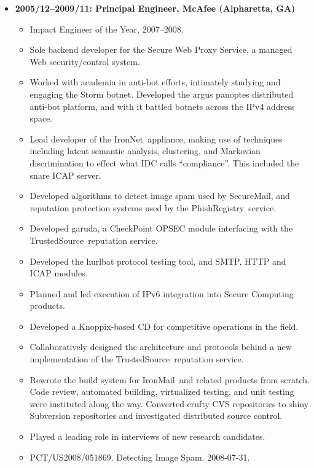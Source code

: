 \documentclass{article}
\newenvironment{tightitemize}
{\begin{itemize}
  \setlength{\itemsep}{1pt}
  \setlength{\parskip}{0pt}
  \setlength{\parsep}{0pt}}
{\end{itemize}}
\begin{document}
\begin{tightitemize}
\item \textbf{2005/12--2009/11: Principal Engineer, McAfee (Alpharetta, GA)}
\begin{tightitemize}
\item Impact Engineer of the Year, 2007--2008.
\item Sole backend developer for the Secure Web Proxy Service, a managed Web
  security/control system.
\item Worked with academia in anti-bot efforts, intimately studying and engaging
  the Storm botnet. Developed the argus panoptes distributed anti-bot
  platform, and with it battled botnets across the IPv4 address space.
\item Lead developer of the IronNet\texttrademark\ appliance, making use of techniques
  including latent semantic analysis, clustering, and Markovian discrimination
  to effect what IDC calls ``compliance''. This included the snare ICAP server.
\item Developed algorithms to detect image spam used by SecureMail\texttrademark, and
  reputation protection systems used by the PhishRegistry\texttrademark\ service.
\item Developed garuda, a CheckPoint\textsuperscript{\textregistered} OPSEC module interfacing with the
  TrustedSource\texttrademark\ reputation service.
\item Developed the hurlbat protocol testing tool, and SMTP, HTTP and ICAP modules.
\item Planned and led execution of IPv6 integration into Secure Computing products.
\item Developed a Knoppix\textsuperscript{\textregistered}-based CD for competitive operations in the field.
\item Collaboratively designed the architecture and protocols behind a new
  implementation of the TrustedSource\texttrademark\ reputation service.
\item Rewrote the build system for IronMail\texttrademark\ and related products from scratch.
  Code review, automated building, virtualized testing, and unit testing were
  instituted along the way. Converted crufty CVS repositories to shiny
  Subversion repositories and investigated distributed source control.
\item Played a leading role in interviews of new research candidates.
\item PCT/US2008/051869. Detecting Image Spam. 2008-07-31.
\end{tightitemize}


\end{tightitemize}
\end{document}
